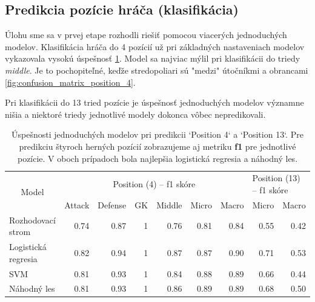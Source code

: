 \documentclass[runningheads]{llncs}
\begin{document}
\subsection{Predikcia pozície hráča (klasifikácia)}

Úlohu sme sa v prvej etape rozhodli riešiť pomocou viacerých jednoduchých modelov. Klasifikácia hráča do 4 pozícií už pri základných nastaveniach modelov vykazovala vysokú úspešnosť \ref{tab:f1_position_4}. Model sa najviac mýlil pri klasifikácii do triedy \textit{middle}. Je to pochopiteľné, keďže stredopoliari sú "medzi" útočníkmi a obrancami \ref{fig:confusion_matrix_position_4}. 

Pri klasifikácii do 13 tried pozície je úspešnosť jednoduchých modelov významne nišia a niektoré triedy jednotlivé modely dokonca vôbec nepredikovali.

\begin{table}[]
    \begin{tabular}{|l|rrrrrr|rr}
    \hline
    \multicolumn{1}{|c|}{\multirow{2}{*}{Model}} & \multicolumn{6}{c|}{Position (4) -- f1 skóre}                               & \multicolumn{2}{l|}{Position (13) -- f1 skóre} \\
    \multicolumn{1}{|c|}{}                       & Attack & Defense & GK         & Middle & Micro & \multicolumn{1}{l|}{Macro} & Micro       & \multicolumn{1}{l|}{Macro}       \\ \hline
    Rozhodovací strom                            & 0.74   & 0.87    & 1          & 0.76   & 0.81  & 0.84                       & 0.55        & \multicolumn{1}{r|}{0.42}        \\
    Logistická regresia                          & 0.82   & 0.94    & 1          & 0.87   & 0.87  & 0.90                       & 0.71        & \multicolumn{1}{r|}{0.53}        \\
    SVM                                          & 0.81   & 0.93    & 1          & 0.84   & 0.88  & 0.89                       & 0.66        & \multicolumn{1}{r|}{0.44}        \\
    Náhodný les                                  & 0.81   & 0.93    & 1          & 0.86   & 0.89  & 0.89                       & 0.68        & \multicolumn{1}{r|}{0.50}        \\ \hline
    \end{tabular}
    \\
    \caption{\label{tab:f1_position_4} Úspešnosti jednoduchých modelov pri predikcii `Position 4` a `Position 13`. Pre predikciu štyroch herných pozícií zobrazujeme aj metriku \textbf{f1} pre jednotlivé pozície. V oboch prípadoch bola najlepšia logistická regresia a náhodný les.}
\end{table}
\end{document}
